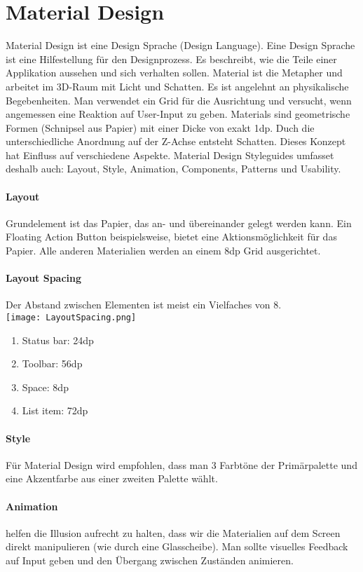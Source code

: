 \section{Material Design}
Material Design ist eine Design Sprache (Design Language). Eine Design Sprache ist eine Hilfestellung für den Designprozess. Es beschreibt, wie die Teile einer Applikation aussehen und sich verhalten sollen. Material ist die Metapher und arbeitet im 3D-Raum mit Licht und Schatten. Es ist angelehnt an physikalische Begebenheiten. Man verwendet ein Grid für die Ausrichtung und versucht, wenn angemessen eine Reaktion auf User-Input zu geben. Materials sind geometrische Formen (Schnipsel aus Papier) mit einer Dicke von exakt 1dp. Duch die unterschiedliche Anordnung auf der Z-Achse entsteht Schatten. Dieses Konzept hat Einfluss auf verschiedene Aspekte. Material Design Styleguides umfasset deshalb auch: Layout, Style, Animation, Components, Patterns und Usability.\\
\paragraph{Layout} Grundelement ist das Papier, das an- und übereinander gelegt werden kann. Ein Floating Action Button beispielsweise, bietet eine Aktionsmöglichkeit für das Papier. Alle anderen Materialien werden an einem 8dp Grid ausgerichtet.
\paragraph{Layout Spacing} Der Abstand zwischen Elementen ist meist ein Vielfaches von 8. \\
\texttt{[image: LayoutSpacing.png]}
\begin{enumerate}
\item Status bar: 24dp
\item Toolbar: 56dp
\item Space: 8dp
\item List item: 72dp
\end{enumerate}
\paragraph{Style} Für Material Design wird empfohlen, dass man 3 Farbtöne der Primärpalette und eine Akzentfarbe aus einer zweiten Palette wählt. 
\paragraph{Animation} helfen die Illusion aufrecht zu halten, dass wir die Materialien auf dem Screen direkt manipulieren (wie durch eine Glasscheibe). Man sollte visuelles Feedback auf Input geben und den Übergang zwischen Zuständen animieren. 
